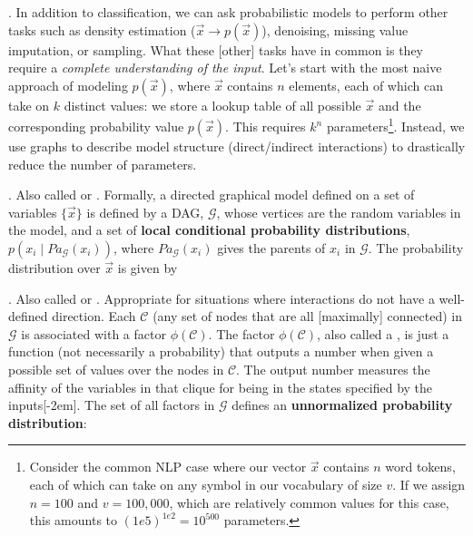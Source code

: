 \documentclass[11pt]{article}
\begin{document}
\p {}. In addition to classification, we can ask probabilistic models to perform other tasks such as density estimation ($\vec{x} \rightarrow p(\vec{x})$), denoising, missing value imputation, or sampling. What these [other] tasks have in common is they require a \textit{complete understanding of the input}. Let's start with the most naive approach of modeling $p(\vec{x})$, where $\vec{x}$ contains $n$ elements, each of which can take on $k$ distinct values: we store a lookup table of all possible $\vec{x}$ and the corresponding probability value $p(\vec{x})$. This requires $k^n$ parameters\footnote{Consider the common NLP case where our vector $\vec{x}$ contains $n$ word tokens, each of which can take on any symbol in our vocabulary of size $v$. If we assign $n=100$ and $v=100,000$, which are relatively common values for this case, this amounts to $(1e5)^{1e2} = 10^{500}$ parameters.}. Instead, we use graphs to describe model structure (direct/indirect interactions) to drastically reduce the number of parameters.

\myspace
\p {}. Also called  or . Formally, a directed graphical model defined on a set of variables $\{\vec{x}\}$ is defined by a DAG, $\mathcal{G}$, whose vertices are the random variables in the model, and a set of \textbf{local conditional probability distributions}, $p(x_i \mid Pa_{\mathcal{G}}(x_i))$, where $Pa_{\mathcal{G}}(x_i)$ gives the parents of $x_i$ in $\mathcal{G}$. The probability distribution over $\vec{x}$ is given by
	
\myspace
\p {}. Also called  or . Appropriate for situations where interactions do not have a well-defined direction. Each  $\mathcal{C}$ (any set of nodes that are all [maximally] connected) in $\mathcal{G}$ is associated with a factor $\phi(\mathcal{C})$. The factor $\phi(\mathcal{C})$, also called a , is just a function (not necessarily a probability) that outputs a number when given a possible set of values over the nodes in $\mathcal{C}$. The output number measures the affinity of the variables in that clique for being in the states specified by the inputs[-2em]. The set of all factors in $\mathcal{G}$ defines an \textbf{unnormalized probability distribution}:
\end{document}
